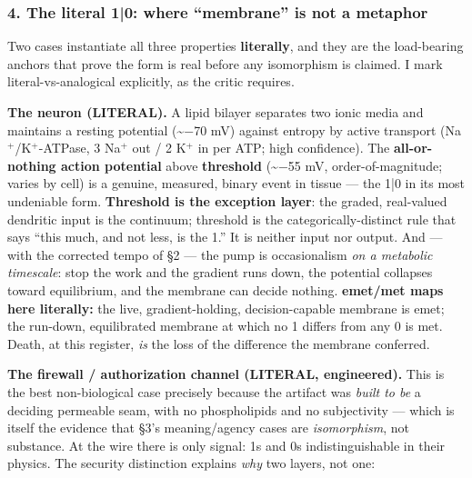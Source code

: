 \documentclass[11pt]{article}
\begin{document}
\subsubsection*{4. The literal 1|0: where ``membrane'' is not a metaphor}

Two cases instantiate all three properties \textbf{literally}, and they are the load-bearing anchors that prove the form is real before any isomorphism is claimed. I mark literal-vs-analogical explicitly, as the critic requires.

\textbf{The neuron (LITERAL).} A lipid bilayer separates two ionic media and maintains a resting potential (\textasciitilde{}−70 mV) against entropy by active transport (Na\ensuremath{^{+}}/\allowbreak{}K\ensuremath{^{+}}-ATPase, 3 Na\ensuremath{^{+}} out /\allowbreak{} 2 K\ensuremath{^{+}} in per ATP; high confidence). The \textbf{all-or-nothing action potential} above \textbf{threshold} (\textasciitilde{}−55 mV, order-of-magnitude; varies by cell) is a genuine, measured, binary event in tissue — the 1|0 in its most undeniable form. \textbf{Threshold is the exception layer}: the graded, real-valued dendritic input is the continuum; threshold is the categorically-distinct rule that says ``this much, and not less, is the 1.'' It is neither input nor output. And — with the corrected tempo of §2 — the pump is occasionalism \emph{on a metabolic timescale}: stop the work and the gradient runs down, the potential collapses toward equilibrium, and the membrane can decide nothing. \textbf{emet/\allowbreak{}met maps here literally:} the live, gradient-holding, decision-capable membrane is emet; the run-down, equilibrated membrane at which no 1 differs from any 0 is met. Death, at this register, \emph{is} the loss of the difference the membrane conferred.

\textbf{The firewall /\allowbreak{} authorization channel (LITERAL, engineered).} This is the best non-biological case precisely because the artifact was \emph{built to be} a deciding permeable seam, with no phospholipids and no subjectivity — which is itself the evidence that §3's meaning/\allowbreak{}agency cases are \emph{isomorphism}, not substance. At the wire there is only signal: 1s and 0s indistinguishable in their physics. The security distinction explains \emph{why} two layers, not one:
\end{document}

